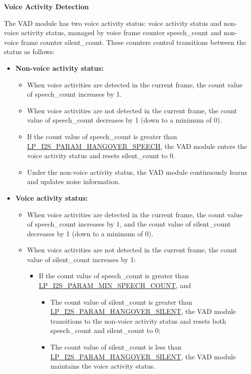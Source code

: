 \documentclass[main\_\_EN.tex]{subfiles}
\begin{document}
\textbf{Voice Activity Detection}

The VAD module has two voice activity status: voice activity status and non-voice activity status, managed by voice frame counter speech\_count and non-voice frame counter silent\_count. These counters control transitions between the status as follows:

\begin{itemize}
    \item \textbf{Non-voice activity status:}
    \begin{itemize}
        \item When voice activities are detected in the current frame, the count value of speech\_count increases by 1.
        \item When voice activities are not detected in the current frame, the count value of speech\_count decreases by 1 (down to a minimum of 0).
        \item If the count value of speech\_count is greater than \hyperref[fielddesc:LPI2SPARAMHANGOVERSPEECH]{LP\_I2S\_PARAM\_HANGOVER\_SPEECH}, the VAD module enters the voice activity status and resets silent\_count to 0.
        \item Under the non-voice activity status, the VAD module continuously learns and updates noise information.
    \end{itemize}
    
    \item \textbf{Voice activity status:}
    \begin{itemize}
        \item When voice activities are detected in the current frame, the count value of speech\_count increases by 1, and the count value of silent\_count decreases by 1 (down to a minimum of 0).
        \item When voice activities are not detected in the current frame, the count value of silent\_count increases by 1:
        \begin{itemize}
            \item If the count value of speech\_count is greater than \hyperref[fielddesc:LPI2SPARAMMINSPEECHCOUNT]{LP\_I2S\_PARAM\_MIN\_SPEECH\_COUNT}, and
            
            \begin{itemize}
                \item The count value of silent\_count is greater than \hyperref[fielddesc:LPI2SPARAMHANGOVERSILENT]{LP\_I2S\_PARAM\_HANGOVER\_SILENT}, the VAD module transitions to the non-voice activity status and resets both speech\_count and silent\_count to 0;
                \item The count value of silent\_count is less than \hyperref[fielddesc:LPI2SPARAMHANGOVERSILENT]{LP\_I2S\_PARAM\_HANGOVER\_SILENT}, the VAD module maintains the voice activity status.
            \end{itemize}
            

\end{itemize}
\end{itemize}
\end{itemize}
\end{document}
